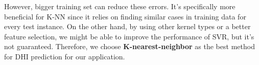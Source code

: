 However, bigger training set can reduce these errors. It's specifically more beneficial for K-NN since it relies on finding similar cases in training data for every test instance. On the other hand, by using other kernel types or a better feature selection, we might be able to improve the performance of SVR, but it's not guaranteed. Therefore, we choose \textbf{K-nearest-neighbor} as the best method for DHI prediction for our application.

